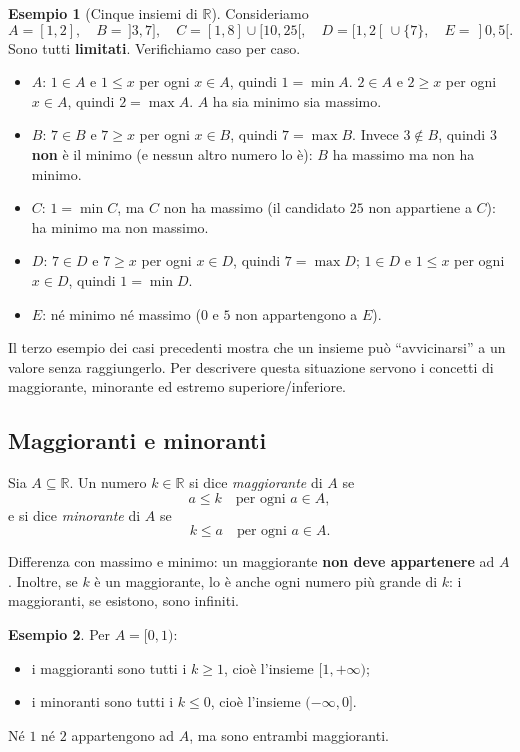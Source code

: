 \documentclass[11pt,a4paper]{article}
\theoremstyle{definition}
\newtheorem*{esempio}{Esempio}
\begin{document}
\begin{esempio}[Cinque insiemi di $\mathbb{R}$]
Consideriamo
\[
A = [1, 2], \quad B = \,]3, 7], \quad C = [1, 8] \cup [10, 25[, \quad
D = [1, 2[ \,\cup \{7\}, \quad E = \,]0, 5[.
\]
Sono tutti \textbf{limitati}. Verifichiamo caso per caso.
\begin{itemize}
    \item $A$: $1 \in A$ e $1 \leq x$ per ogni $x \in A$, quindi $1 = \min A$.
          $2 \in A$ e $2 \geq x$ per ogni $x \in A$, quindi $2 = \max A$.
          $A$ ha sia minimo sia massimo.
    \item $B$: $7 \in B$ e $7 \geq x$ per ogni $x \in B$, quindi $7 = \max B$.
          Invece $3 \notin B$, quindi $3$ \textbf{non} è il minimo (e nessun altro
          numero lo è): $B$ ha massimo ma non ha minimo.
    \item $C$: $1 = \min C$, ma $C$ non ha massimo (il candidato $25$ non
          appartiene a $C$): ha minimo ma non massimo.
    \item $D$: $7 \in D$ e $7 \geq x$ per ogni $x \in D$, quindi $7 = \max D$;
          $1 \in D$ e $1 \leq x$ per ogni $x \in D$, quindi $1 = \min D$.
    \item $E$: né minimo né massimo ($0$ e $5$ non appartengono a $E$).
\end{itemize}
\end{esempio}

Il terzo esempio dei casi precedenti mostra che un insieme può ``avvicinarsi'' a un valore senza
raggiungerlo. Per descrivere questa situazione servono i concetti di
maggiorante, minorante ed estremo superiore/inferiore.

\subsection{Maggioranti e minoranti}

\begin{definizione}
Sia $A \subseteq \mathbb{R}$. Un numero $k \in \mathbb{R}$ si dice
\emph{maggiorante} di $A$ se
\[
a \leq k \quad \text{per ogni } a \in A,
\]
e si dice \emph{minorante} di $A$ se
\[
k \leq a \quad \text{per ogni } a \in A.
\]
\end{definizione}

Differenza con massimo e minimo: un maggiorante \textbf{non deve
appartenere} ad $A$. Inoltre, se $k$ è un maggiorante, lo è anche ogni
numero più grande di $k$: i maggioranti, se esistono, sono infiniti.

\begin{esempio}
Per $A = [0, 1)$:
\begin{itemize}
    \item i maggioranti sono tutti i $k \geq 1$, cioè l'insieme $[1, +\infty)$;
    \item i minoranti sono tutti i $k \leq 0$, cioè l'insieme $(-\infty, 0]$.
\end{itemize}
Né $1$ né $2$ appartengono ad $A$, ma sono entrambi maggioranti.
\end{esempio}
\end{document}
